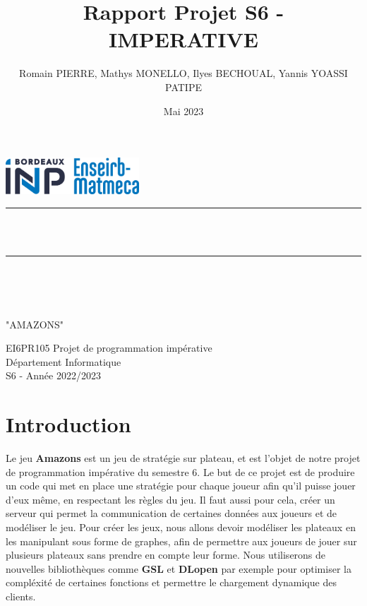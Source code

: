 \documentclass{article}
\title{Rapport Projet S6 - IMPERATIVE}
\author{Romain PIERRE, Mathys MONELLO, Ilyes BECHOUAL, Yannis YOASSI PATIPE}
\date{Mai 2023}
\makeatletter
\let\mytitle\@title
\let\myauthor\@author
\let\mydate\@date
\makeatother
\begin{document}
\lstset{language=C, frame=single, basicstyle=\ttfamily, tabsize=4}

\begin{titlepage}
    \centering
    \vspace*{0.5 cm}
    \includegraphics[width=5cm]{logo.jpg}\\[1.0 cm]
    \rule{\linewidth}{0.2 mm} \\[0.4 cm]
    \huge\textbf{\mytitle}\\
    \rule{\linewidth}{0.2 mm} \\[1.5 cm]  
    \LARGE\myauthor\\[1.0 cm]
    \large\textbf{\mydate}\\[2 cm]
    \begin{center}
        \huge
        "AMAZONS"
    \end{center}

    \vspace{4cm}
    \begin{center}
    EI6PR105 Projet de programmation impérative
    \\Département Informatique
    \\S6 - Année 2022/2023
    \end{center}
 \end{titlepage}

\tableofcontents

\newpage
\section{Introduction}
Le jeu \textbf{Amazons} est un jeu de stratégie sur plateau, et est l'objet de notre projet de programmation impérative du semestre 6. Le but de ce projet est de produire un code qui met en place une stratégie pour chaque joueur afin qu'il puisse jouer d'eux même, en respectant les règles du jeu. Il faut aussi pour cela, créer un serveur qui permet la communication de certaines données aux joueurs et de modéliser le jeu. Pour créer les jeux, nous allons devoir modéliser les plateaux en les manipulant sous forme de graphes, afin de permettre aux joueurs de jouer sur plusieurs plateaux sans prendre en compte leur forme. Nous utiliserons de nouvelles bibliothèques comme \textbf{GSL} et \textbf{DLopen} par exemple pour optimiser la compléxité de certaines fonctions et permettre le chargement dynamique des clients.
\end{document}
